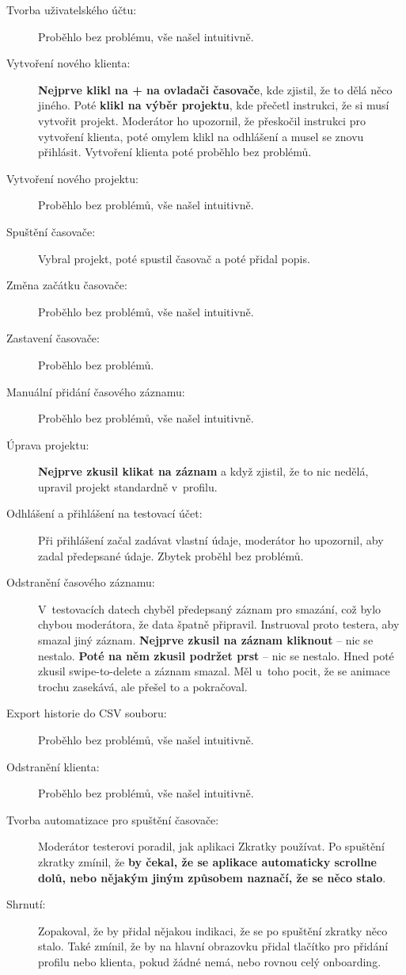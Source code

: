 \begin{description}
\item[Tvorba uživatelského účtu:] Proběhlo bez problému, vše našel intuitivně.
\item[Vytvoření nového klienta:] \textbf{Nejprve klikl na + na ovladači časovače}, kde zjistil, že to dělá něco jiného. Poté \textbf{klikl na výběr projektu}, kde přečetl instrukci, že si musí vytvořit projekt. Moderátor ho upozornil, že přeskočil instrukci pro vytvoření klienta, poté omylem klikl na odhlášení a musel se znovu přihlásit. Vytvoření klienta poté proběhlo bez problémů.
\item[Vytvoření nového projektu:] Proběhlo bez problémů, vše našel intuitivně.
\item[Spuštění časovače:] Vybral projekt, poté spustil časovač a poté přidal popis.
\item[Změna začátku časovače:] Proběhlo bez problémů, vše našel intuitivně.
\item[Zastavení časovače:] Proběhlo bez problémů.
\item[Manuální přidání časového záznamu:] Proběhlo bez problémů, vše našel intuitivně.
\item[Úprava projektu:] \textbf{Nejprve zkusil klikat na záznam} a když zjistil, že to nic nedělá, upravil projekt standardně v~profilu.
\item[Odhlášení a přihlášení na testovací účet:] Při přihlášení začal zadávat vlastní údaje, moderátor ho upozornil, aby zadal předepsané údaje. Zbytek proběhl bez problémů.
\item[Odstranění časového záznamu:] V~testovacích datech chyběl předepsaný záznam pro smazání, což bylo chybou moderátora, že data špatně připravil. Instruoval proto testera, aby smazal jiný záznam. \textbf{Nejprve zkusil na záznam kliknout} – nic se nestalo. \textbf{Poté na něm zkusil podržet prst} – nic se nestalo. Hned poté zkusil swipe-to-delete a záznam smazal. Měl u~toho pocit, že se animace trochu zasekává, ale přešel to a pokračoval.
\item[Export historie do CSV souboru:] Proběhlo bez problémů, vše našel intuitivně.
\item[Odstranění klienta:] Proběhlo bez problémů, vše našel intuitivně.
\item[Tvorba automatizace pro spuštění časovače:] Moderátor testerovi poradil, jak aplikaci Zkratky používat. Po spuštění zkratky zmínil, že \textbf{by čekal, že se aplikace automaticky scrollne dolů, nebo nějakým jiným způsobem naznačí, že se něco stalo}.
\item[Shrnutí:] Zopakoval, že by přidal nějakou indikaci, že se po spuštění zkratky něco stalo. Také zmínil, že by na hlavní obrazovku přidal tlačítko pro přidání profilu nebo klienta, pokud žádné nemá, nebo rovnou celý onboarding.
\end{description}

